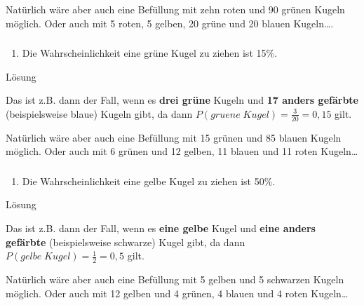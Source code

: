 \documentclass[
  ngerman,
]{book}
\providecommand{\tightlist}{%
  \setlength{\itemsep}{0pt}\setlength{\parskip}{0pt}}
\begin{document}
Natürlich wäre aber auch eine Befüllung mit zehn roten und 90 grünen Kugeln möglich. Oder auch mit 5 roten, 5 gelben, 20 grüne und 20 blauen Kugeln\ldots.

\hypertarget{section-98}{%
\subsubsection*{}\label{section-98}}

\begin{enumerate}
\def\labelenumi{\alph{enumi})}
\setcounter{enumi}{2}
\tightlist
\item
  Die Wahrscheinlichkeit eine grüne Kugel zu ziehen ist 15\%.
\end{enumerate}

Lösung

Das ist z.B. dann der Fall, wenn es \textbf{drei grüne} Kugeln und \textbf{17 anders gefärbte} (beispielsweise blaue) Kugeln gibt, da dann \(P(gruene\;Kugel)=\frac{3}{20}=0,15\) gilt.

Natürlich wäre aber auch eine Befüllung mit 15 grünen und 85 blauen Kugeln möglich. Oder auch mit 6 grünen und 12 gelben, 11 blauen und 11 roten Kugeln\ldots{}

\hypertarget{section-99}{%
\subsubsection*{}\label{section-99}}

\begin{enumerate}
\def\labelenumi{\alph{enumi})}
\setcounter{enumi}{3}
\tightlist
\item
  Die Wahrscheinlichkeit eine gelbe Kugel zu ziehen ist 50\%.
\end{enumerate}

Lösung

Das ist z.B. dann der Fall, wenn es \textbf{eine gelbe} Kugel und \textbf{eine anders gefärbte} (beispielsweise schwarze) Kugel gibt, da dann \(P(gelbe\;Kugel)=\frac{1}{2}=0,5\) gilt.

Natürlich wäre aber auch eine Befüllung mit 5 gelben und 5 schwarzen Kugeln möglich. Oder auch mit 12 gelben und 4 grünen, 4 blauen und 4 roten Kugeln\ldots{}

\hypertarget{section-100}{%
\subsubsection*{}\label{section-100}}
\end{document}
